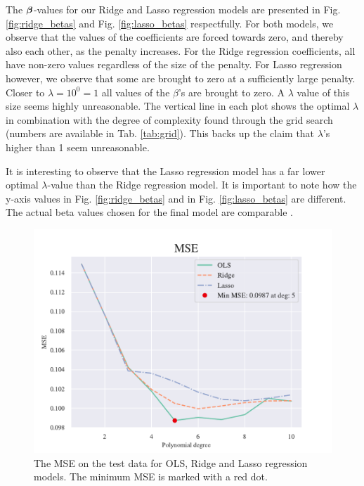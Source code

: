 The $\boldsymbol{\beta}$-values for our Ridge and Lasso regression models are presented in Fig. \ref{fig:ridge_betas} and Fig. \ref{fig:lasso_betas} respectfully. For both models, we observe that the values of the coefficients are forced towards zero, and thereby also each other, as the penalty increases. For the Ridge regression coefficients, all have non-zero values regardless of the size of the penalty. For Lasso regression however, we observe that some are brought to zero at a sufficiently large penalty. Closer to $\lambda = 10^0 = 1$ all values of the $\beta$'s are brought to zero. A $\lambda$ value of this size seems highly unreasonable. 
The vertical line in each plot shows the optimal $\lambda$ in combination with the degree of complexity found through the grid search (numbers are available in Tab. \ref{tab:grid}). This backs up the claim that $\lambda$'s higher than 1 seem unreasonable. 

It is interesting to observe that the Lasso regression model has a far lower optimal $\lambda$-value than the Ridge regression model. It is important to note how the y-axis values in Fig. \ref{fig:ridge_betas} and in Fig. \ref{fig:lasso_betas} are different. The actual beta values chosen for the final model are comparable . 

\begin{figure}[h!]
    \centering
    \includegraphics[width=1\linewidth]{project_1/figures/figures_in_report/OLS_Ridge_Lasso_Franke_Noise.pdf}
    \caption{The MSE on the test data for OLS, Ridge and Lasso regression models. The minimum MSE is marked with a red dot.}
    \label{all3franke}
\end{figure}

